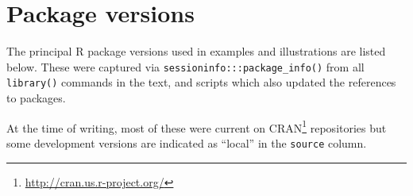 \documentclass[
  letterpaper,
  10pt,
  krantz2]{krantz}
\providecommand{\href}[2]{#2\footnote{\url{#1}}}
\begin{document}
\section*{Package versions}\label{package-versions}


The principal R package versions used in examples and illustrations are
listed below. These were captured via
\texttt{sessioninfo:::package\_info()} from all \texttt{library()}
commands in the text, and scripts which also updated the references to
packages.

At the time of writing, most of these were current on
\href{http://cran.us.r-project.org/}{CRAN} repositories but some
development versions are indicated as ``local'' in the \texttt{source}
column.
\end{document}
